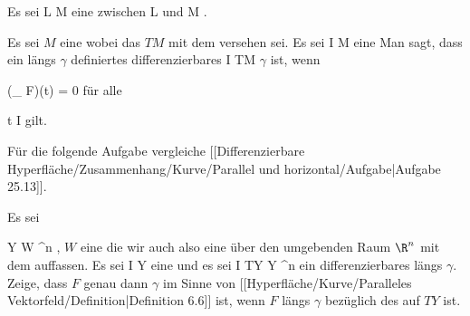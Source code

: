 {}
{

Es sei
\maabb {\psi} { L } { M
} {}
eine
zwischen
\mathkor {} {L} {und} {M} {.}

}
{} {}

Es sei $M$ eine
wobei das
$TM$ mit dem
versehen sei. Es sei
\maabb {\gamma} { I } { M
} {}
eine
Man sagt, dass ein längs $\gamma$ definiertes differenzierbares
 { I } { TM
} {}
$\gamma$ ist, wenn

\mavergleichskettedisp
{\vergleichskette
{ (\nabla_{\partial} F)(t)
}
{ =} { 0
}
{ } {
}
{ } {
}
{ } {
}
}
{}{}{}
für alle

\mavergleichskette
{\vergleichskette
{ t
}
{ \in }{ I
}
{  }{
}
{    }{
}
{   }{
}
}
{}{}{}
gilt.

Für die folgende Aufgabe vergleiche
[[Differenzierbare Hyperfläche/Zusammenhang/Kurve/Parallel und horizontal/Aufgabe|Aufgabe 25.13]].

{}
{

Es sei

\mavergleichskette
{\vergleichskette
{ Y
}
{ \subseteq }{ W
}
{ \subseteq }{ \R^n
}
{    }{
}
{   }{
}
}
{}{}{,}
$W$
eine
die wir auch also eine
über den umgebenden Raum $\R^n$ mit dem
auffassen.
Es sei
\maabb {\gamma} { I } { Y
} {}
eine
und es sei
 { I } { TY \subseteq Y \times \R^n
} {}
ein differenzierbares
längs $\gamma$.  Zeige, dass $F$ genau dann
$\gamma$ im Sinne von
[[Hyperfläche/Kurve/Paralleles Vektorfeld/Definition|Definition 6.6]]
ist, wenn $F$
längs $\gamma$ bezüglich des
auf $TY$ ist.

}
{} {}

